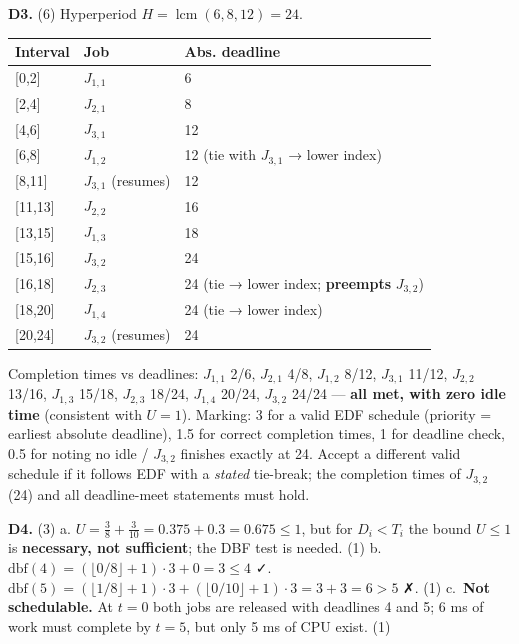 \documentclass[
  11pt,
]{article}
\newcounter{none} %
\begin{document}
\textbf{D3.} (6) Hyperperiod \(H = \operatorname{lcm}(6, 8, 12) = 24\).

{\def\LTcaptype{none} %
\begin{longtable}[]{@{}lll@{}}
\toprule\noalign{}
Interval & Job & Abs. deadline \\
\midrule\noalign{}
\endhead
\bottomrule\noalign{}
\endlastfoot
{[}0,2{]} & \(J_{1,1}\) & 6 \\
{[}2,4{]} & \(J_{2,1}\) & 8 \\
{[}4,6{]} & \(J_{3,1}\) & 12 \\
{[}6,8{]} & \(J_{1,2}\) & 12 (tie with \(J_{3,1}\) → lower index) \\
{[}8,11{]} & \(J_{3,1}\) (resumes) & 12 \\
{[}11,13{]} & \(J_{2,2}\) & 16 \\
{[}13,15{]} & \(J_{1,3}\) & 18 \\
{[}15,16{]} & \(J_{3,2}\) & 24 \\
{[}16,18{]} & \(J_{2,3}\) & 24 (tie → lower index; \textbf{preempts}
\(J_{3,2}\)) \\
{[}18,20{]} & \(J_{1,4}\) & 24 (tie → lower index) \\
{[}20,24{]} & \(J_{3,2}\) (resumes) & 24 \\
\end{longtable}
}

Completion times vs deadlines: \(J_{1,1}\) 2/6, \(J_{2,1}\) 4/8,
\(J_{1,2}\) 8/12, \(J_{3,1}\) 11/12, \(J_{2,2}\) 13/16, \(J_{1,3}\)
15/18, \(J_{2,3}\) 18/24, \(J_{1,4}\) 20/24, \(J_{3,2}\) 24/24 ---
\textbf{all met, with zero idle time} (consistent with \(U = 1\)).
Marking: 3 for a valid EDF schedule (priority = earliest absolute
deadline), 1.5 for correct completion times, 1 for deadline check, 0.5
for noting no idle / \(J_{3,2}\) finishes exactly at 24. Accept a
different valid schedule if it follows EDF with a \emph{stated}
tie-break; the completion times of \(J_{3,2}\) (24) and all
deadline-meet statements must hold.

\textbf{D4.} (3) a.
\(U = \tfrac38 + \tfrac3{10} = 0.375 + 0.3 = 0.675 \le 1\), but for
\(D_i < T_i\) the bound \(U \le 1\) is \textbf{necessary, not
sufficient}; the DBF test is needed. (1) b.
\(\text{dbf}(4) = \left(\lfloor 0/8 \rfloor + 1\right)\cdot 3 + 0 = 3 \le 4\)
✓.
\(\text{dbf}(5) = \left(\lfloor 1/8 \rfloor + 1\right)\cdot 3 + \left(\lfloor 0/10 \rfloor + 1\right)\cdot 3 = 3 + 3 = 6 > 5\)
✗. (1) c.~\textbf{Not schedulable.} At \(t=0\) both jobs are released
with deadlines 4 and 5; 6 ms of work must complete by \(t = 5\), but
only 5 ms of CPU exist. (1)
\end{document}

